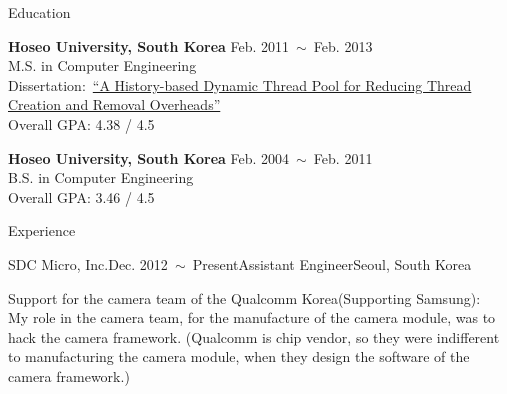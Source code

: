 \documentclass{resume} %
\begin{document}


\begin{rSection}{Education}

{\bf Hoseo University, South Korea} \hfill Feb. 2011~$\sim$~Feb. 2013 \\
M.S. in Computer Engineering \\
Dissertation:~\href{http://dlibrary.hoseo.ac.kr/search/searchDetail.do?rec_key=SH1_000000950591}
{\footnotesize ``A History-based Dynamic Thread Pool for Reducing Thread Creation and Removal Overheads''} \\
Overall GPA: 4.38 / 4.5

{\bf Hoseo University, South Korea} \hfill Feb. 2004~$\sim$~Feb. 2011 \\
B.S. in Computer Engineering \\
Overall GPA: 3.46 / 4.5

\end{rSection}



\begin{rSection}{Experience}



  \begin{rSubsection}{SDC Micro, Inc.}{Dec. 2012~$\sim$~Present}{Assistant Engineer}{Seoul, South Korea}
  \item Support for the camera team of the Qualcomm Korea(Supporting Samsung): \\
    \small{
      My role in the camera team, for the manufacture of the camera module, was to hack the camera framework.
      \footnotesize{
        (Qualcomm is chip vendor, so they were indifferent to manufacturing the camera module,
        when they design the software of the camera framework.)}}
  \end{rSubsection}

\end{rSection}
\vspace{-2mm}
\end{document}
